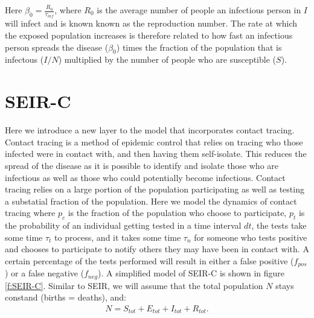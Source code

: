 \documentclass[notitlepage, superscriptaddress]{revtex4-2}
\begin{document}
Here $\beta_0 = \frac{R_{0}}{\tau_{inf}}$, where $R_{0}$ is the average number of people an infectious person in $I$ will infect and is known known as the reproduction number. The rate at which the exposed population increases is therefore related to how fast an infectious person spreads the disease ($\beta_{0}$) times the fraction of the population that is infectous ($I/N$) multiplied by the number of people who are susceptible ($S$).

\section{SEIR-C}

Here we introduce a new layer to the model that incorporates contact tracing. Contact tracing is a method of epidemic control that relies on tracing who those infected were in contact with, and then having them self-isolate. This reduces the spread of the disease as it is possible to identify and isolate those who are infectious as well as those who could potentially become infectious. Contact tracing relies on a large portion of the population participating as well as testing a substatial fraction of the population. Here we model the dynamics of contact tracing where $p_{c}$ is the fraction of the population who choose to participate, $p_t$ is the probability of an individual getting tested in a time interval $dt$, the tests take some time $\tau_{t}$ to process, and it takes some time $\tau_{n}$ for someone who tests positive and chooses to participate to notify others they may have been in contact with. A certain percentage of the tests performed will result in either a false positive ($f_{pos}$) or a false negative ($f_{neg}$). A simplified model of SEIR-C is shown in figure \ref{f:SEIR-C}. Similar to SEIR, we will assume that the total population $N$ stays constand (births = deaths), and:
\begin{eqnarray}
\label{E:SEIRPop_c}
N = S_{tot} + E_{tot} + I_{tot} + R_{tot}.
\end{eqnarray}
\end{document}
